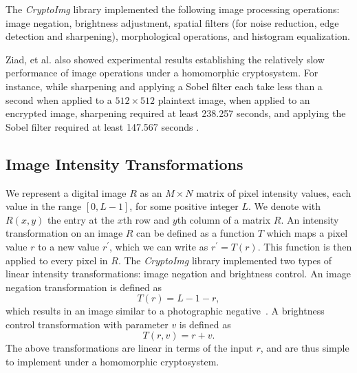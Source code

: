 The \textit{CryptoImg} library implemented the following image processing operations: image negation, brightness adjustment, spatial filters (for noise reduction, edge detection and sharpening), morphological operations, and histogram equalization.


Ziad, et al. also showed experimental results establishing the relatively slow performance of image operations under a homomorphic cryptosystem. For instance, while sharpening and applying a Sobel filter each take less than a second when applied to a $512\times 512$ plaintext image, when applied to an encrypted image, sharpening required at least 238.257 seconds, and applying the Sobel filter required at least 147.567 seconds \cite{ziad_cryptoimg:_2016}.



\subsection{Image Intensity Transformations}
We represent a digital image $R$ as an $M \times N$ matrix of pixel intensity values, each value in the range $\left[0, L-1\right]$, for some positive integer $L$. We denote with $R(x,y)$ the entry at the $x$th row and $y$th column of a matrix $R$.
An intensity transformation on an image $R$ can be defined as a function $T$ which maps a pixel value $r$ to a new value $r^\prime$, which we can write as $r^\prime = T\left(r\right)$. This function is then applied to every pixel in $R$.
The \textit{CryptoImg} library implemented two types of linear intensity transformations: image negation and brightness control. An image negation transformation is defined as
\begin{equation}
    T\left(r\right) = L-1-r,
\end{equation}
which results in an image similar to a photographic negative~\cite{gonzalez_digital_2008}.
A brightness control transformation with parameter $v$ is defined as
\begin{equation}
    T\left(r,v\right) = r+v.
\end{equation}
The above transformations are linear in terms of the input $r$, and are thus simple to implement under a homomorphic cryptosystem.

